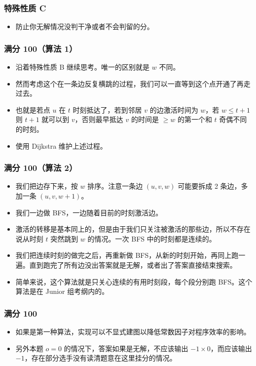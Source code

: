 \documentclass[aspectratio=169]{ctexbeamer}
\begin{document}
\begin{frame}
  \frametitle{特殊性质 C}

  \begin{itemize}
    \item <1 - > 防止你无解情况没判干净或者不会判留的分。
  \end{itemize}

\end{frame}

\begin{frame}
  \frametitle{满分 100（算法 1）}

  \begin{itemize}
    \item <1 - > 沿着特殊性质 B 继续思考。唯一的区别就是 $w$ 不同。
    \item <2 - > 然而考虑这个在一条边反复横跳的过程，我们可以一直等到这个点开通了再走过去。
    \item <3 - > 也就是若点 $u$ 在 $t$ 时刻抵达了，若到邻居 $v$ 的边激活时间为 $w$，若 $w\leq t+1$ 则 $t+1$ 就可以到 $v$，否则最早抵达 $v$ 的时间是 $\geq w$ 的第一个和 $t$ 奇偶不同的时刻。
    \item <4 - > 使用 Dijkstra 维护上述过程。
  \end{itemize}

\end{frame}

\begin{frame}
  \frametitle{满分 100（算法 2）}

  \begin{itemize}
    \item <1 - > 我们把边存下来，按 $w$ 排序。注意一条边 $(u,v,w)$ 可能要拆成 2 条边，多加一条 $(u,v,w+1)$。
    \item <2 - > 我们一边做 BFS，一边随着目前的时刻激活边。
    \item <3 - > 激活的转移是基本同上的，但是由于我们只关注被激活的那些边，所以不存在说从时刻 $t$ 突然跳到 $w$ 的情况。一次 BFS 中的时刻都是连续的。
    \item <4 - > 我们把连续时刻的做完之后，再重新做 BFS，从新的时刻开始，再同上跑一遍。直到跑完了所有边没出答案就是无解，或者出了答案直接结束搜索。
    \item <5 - > 简单来说，这个算法就是只关心连续的有用时刻段，每个段分别跑 BFS。这个算法是在 Junior 组考纲内的。
  \end{itemize}

\end{frame}

\begin{frame}
  \frametitle{满分 100}

  \begin{itemize}
    \item <1 - > 如果是第一种算法，实现可以不显式建图以降低常数因子对程序效率的影响。
    \item <2 - > 另外本题 $o=0$ 的情况下，答案如果是无解，不应该输出 $-1\times 0$，而应该输出 $-1$，存在部分选手没有读清题意在这里挂分的情况。
  \end{itemize}

\end{frame}
\end{document}
